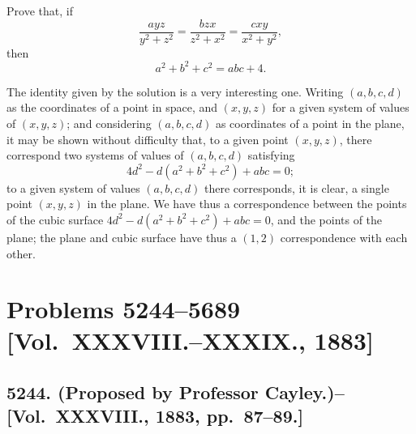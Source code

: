 \documentclass[11pt,a4paper]{book}
\begin{document}
Prove that, if
\[
\frac{ayz}{y^2+z^2} = \frac{bzx}{z^2+x^2} = \frac{cxy}{x^2+y^2},
\]
then
\[
a^2+b^2+c^2 = abc+4.
\]

\begin{note}
The identity given by the solution is a very interesting one. Writing $(a,b,c,d)$ as the coordinates of a point in space, and $(x,y,z)$ for a given system of values of $(x,y,z)$; and considering $(a,b,c,d)$ as coordinates of a point in the plane, it may be shown without difficulty that, to a given point $(x,y,z)$, there correspond two systems of values of $(a,b,c,d)$ satisfying
\[
4d^2 - d(a^2+b^2+c^2) + abc = 0;
\]
to a given system of values $(a,b,c,d)$ there corresponds, it is clear, a single point $(x,y,z)$ in the plane. We have thus a correspondence between the points of the cubic surface $4d^2 - d(a^2+b^2+c^2) + abc = 0$, and the points of the plane; the plane and cubic surface have thus a $(1,2)$ correspondence with each other.
\end{note}

\newpage

\section*{Problems 5244--5689 [Vol.~XXXVIII.--XXXIX., 1883]}

\subsection*{5244. (Proposed by Professor Cayley.)\---[Vol.~XXXVIII., 1883, pp.~87--89.]}
\end{document}
